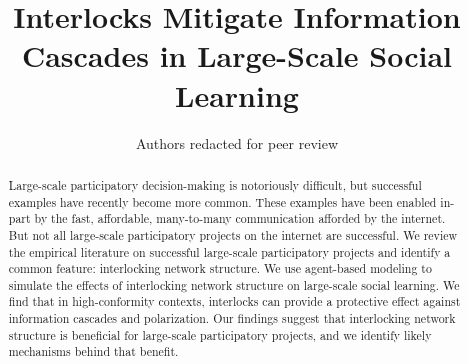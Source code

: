 \documentclass[manuscript,screen,review,acmsmall]{acmart}
\begin{document}
\title{Interlocks Mitigate Information Cascades in Large-Scale Social Learning}

\author{Authors redacted for peer review}





\begin{abstract}
Large-scale participatory decision-making is notoriously difficult, but successful examples have recently become more common. These examples have been enabled in-part by the fast, affordable, many-to-many communication afforded by the internet. But not all large-scale participatory projects on the internet are successful. We review the empirical literature on successful large-scale participatory projects and identify a common feature: interlocking network structure. We use agent-based modeling to simulate the effects of interlocking network structure on large-scale social learning. We find that in high-conformity contexts, interlocks can provide a protective effect against information cascades and polarization. Our findings suggest that interlocking network structure is beneficial for large-scale participatory projects, and we identify likely mechanisms behind that benefit.
\end{abstract}
\end{document}
